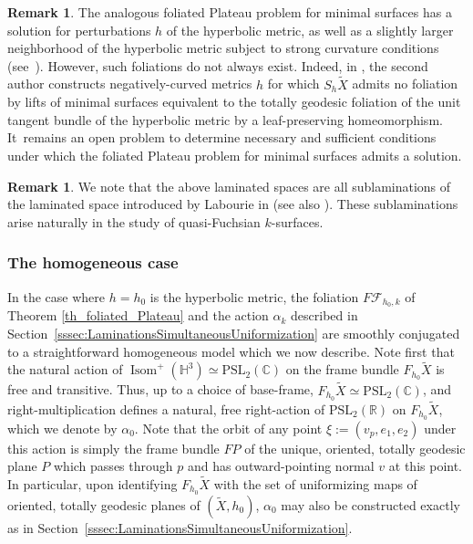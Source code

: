 \documentclass[11pt]{article}
\newcommand{\ksurfaces}{$k$\nobreakdash-surfaces\xspace}
\theoremstyle{plain}
\theoremstyle{definition}
\newtheorem{remark}[theorem]{Remark}
\newcommand\PSL{\mathrm{PSL}_2(\mathbb{R})}
\newcommand\PSLc{\mathrm{PSL}_2(\mathbb{C})}
\newcommand\Hyp{\mathbb{H}^3}
\newcommand{\cF}{{\mathcal F}}
\DeclareMathOperator{\Isom}{Isom}
\begin{document}
\begin{remark}
The analogous foliated Plateau problem for minimal surfaces has a solution for perturbations $h$ of the hyperbolic metric, as well as a slightly larger neighborhood of the hyperbolic metric subject to strong curvature conditions (see~\hbox{\cite{Gromov_FolPlateau1,LoweGAFA}}). However, such foliations do not always exist. Indeed, in \cite{LoweGAFA}, the second author constructs negatively-curved metrics $h$ for which $S_h\tilde{X}$ admits no foliation by lifts of minimal surfaces equivalent to the totally geodesic foliation of the unit tangent bundle of the hyperbolic metric by a leaf-preserving homeomorphism. It~remains an open problem to determine necessary and sufficient conditions under which the foliated Plateau problem for minimal surfaces admits a solution.
\end{remark}

\begin{remark}We note that the above laminated spaces are all sublaminations of the laminated space introduced by Labourie in \cite{LabourieGAFA,LabourieInvent,LabourieAnnals} (see also \cite{Smith_asymp}). These sublaminations arise naturally in the study of quasi-Fuchsian \ksurfaces.
\end{remark}

\subsubsection{The homogeneous case}
In the case where $h=h_0$ is the hyperbolic metric, the foliation $F\cF_{h_0,k}$ of Theorem \ref{th_foliated_Plateau} and the action $\alpha_k$ described in Section~\ref{sssec:LaminationsSimultaneousUniformization} are smoothly conjugated to a straightforward homogeneous model which we now describe. Note first that the natural action of $\Isom^+(\Hyp)\simeq\PSLc$ on the frame bundle $F_{h_0}\tilde{X}$ is free and transitive. Thus, up to a choice of base-frame, $F_{h_0}\tilde{X}\simeq\PSLc$, and right-multiplication defines a natural, free right-action of $\PSL$ on $F_{h_0}\tilde{X}$, which we denote by $\alpha_0$. Note that the orbit of any point $\xi:=(v_p,e_1,e_2)$ under this action is simply the frame bundle $FP$ of the unique, oriented, totally geodesic plane $P$ which passes through $p$ and has outward-pointing normal $v$ at this point. In particular, upon identifying $F_{h_0}\tilde{X}$ with the set of uniformizing maps of oriented, totally geodesic planes of $(\tilde{X},h_0)$, $\alpha_0$ may also be constructed exactly as in Section~\ref{sssec:LaminationsSimultaneousUniformization}.
\end{document}
